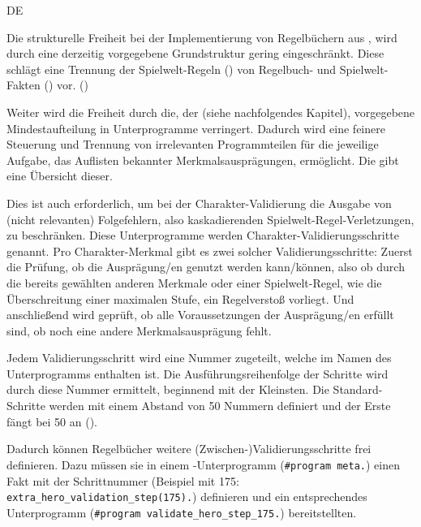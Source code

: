 \begin{enumerateWithCode}[0em plus 1em]{DE}
    \item\label{itm:DE.LpDateistruktur} Die strukturelle Freiheit bei der Implementierung von Regelbüchern aus , wird durch eine derzeitig vorgegebene Grundstruktur gering eingeschränkt.
    Diese schlägt eine Trennung der Spielwelt-Regeln () von Regelbuch- und Spielwelt-Fakten () vor.
    (\vgl {})

    \item\label{itm:DE.EngineUnterprogramme} Weiter wird die Freiheit durch die, der  (siehe nachfolgendes Kapitel), vorgegebene Mindestaufteilung in Unterprogramme verringert.
    Dadurch wird eine feinere Steuerung und Trennung von irrelevanten Programmteilen für die jeweilige Aufgabe, \zB das Auflisten bekannter Merkmalsausprägungen, ermöglicht.
    Die  gibt eine Übersicht dieser.

    Dies ist auch erforderlich, um \insb bei der Charakter-Validierung die Ausgabe von (nicht relevanten) Folgefehlern, also kaskadierenden Spielwelt-Regel-Verletzungen, zu beschränken.
    Diese Unterprogramme werden Charakter-Va\-li\-die\-rungs\-schritte genannt.
    Pro Charakter-Merkmal gibt es \idR zwei solcher Va\-li\-die\-rungs\-schritte:
    Zuerst die Prüfung, ob die Ausprägung/en genutzt werden kann/können, also ob durch die bereits gewählten anderen Merkmale oder einer Spielwelt-Regel, wie die Überschreitung einer maximalen Stufe, ein Regelverstoß vorliegt.
    Und anschließend wird geprüft, ob alle Voraussetzungen der Ausprägung/en erfüllt sind, \zB ob noch eine andere Merkmalsausprägung fehlt.

    \item\label{itm:DE.ExtraStep} Jedem Validierungsschritt wird eine Nummer zugeteilt, welche im Namen des Unterprogramms enthalten ist.
    Die Ausführungsreihenfolge der Schritte wird durch diese Nummer ermittelt, beginnend mit der Kleinsten.
    Die Standard-Schritte werden mit einem Abstand von 50 Nummern definiert und der Erste fängt bei 50 an (\vgl {}).

    Dadurch können Regelbücher weitere (Zwischen-)Validierungsschritte frei definieren.
    Dazu müssen sie in einem -Unterprogramm (\texttt{#program meta.}) einen Fakt mit der Schrittnummer (Beispiel mit 175: \texttt{extra_hero_validation_step(175).}) definieren und ein entsprechendes Unterprogramm (\texttt{#program validate_hero_step_175.}) bereitstellten.

\end{enumerateWithCode}


